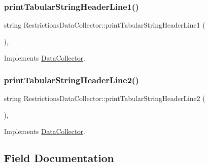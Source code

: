 \subsubsection{\texorpdfstring{print\+Tabular\+String\+Header\+Line1()}{printTabularStringHeaderLine1()}}
{\footnotesize\ttfamily string Restrictions\+Data\+Collector\+::print\+Tabular\+String\+Header\+Line1 (\begin{DoxyParamCaption}{ }\end{DoxyParamCaption})\hspace{0.3cm}{\ttfamily [override]}, {\ttfamily [virtual]}}



Implements \mbox{\hyperlink{classDataCollector_a91619cfa9e9b8cefd2f7c20d5718b41e_a91619cfa9e9b8cefd2f7c20d5718b41e}{Data\+Collector}}.

\mbox{\label{classRestrictionsDataCollector_afb3c49c2c9b152bb2372e2fcc198e1b8_afb3c49c2c9b152bb2372e2fcc198e1b8}} 
\subsubsection{\texorpdfstring{print\+Tabular\+String\+Header\+Line2()}{printTabularStringHeaderLine2()}}
{\footnotesize\ttfamily string Restrictions\+Data\+Collector\+::print\+Tabular\+String\+Header\+Line2 (\begin{DoxyParamCaption}{ }\end{DoxyParamCaption})\hspace{0.3cm}{\ttfamily [override]}, {\ttfamily [virtual]}}



Implements \mbox{\hyperlink{classDataCollector_af01ea961314be2164f39e6d4cd59e443_af01ea961314be2164f39e6d4cd59e443}{Data\+Collector}}.



\subsection{Field Documentation}
\mbox{\label{classRestrictionsDataCollector_afb6bc7f42a2490e2599c37baebe3995c_afb6bc7f42a2490e2599c37baebe3995c}} 
